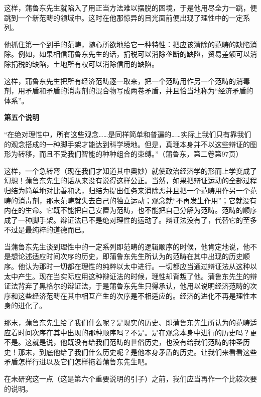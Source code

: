 \documentclass[a4paper,twoside,12pt,AutoFakeBold]{ctexart}
\begin{document}
这样，蒲鲁东先生就陷入了用正当方法难以摆脱的困境，于是他用尽全力一跳，便跳到一个新范畴的领域中。这时在他那惊异的目光面前便出现了理性中的一定系列。

他抓住第一个到手的范畴，随心所欲地给它一种特性：把应该清除的范畴的缺陷消除。例如，如果相信蒲鲁东先生的话，捐税可以消除垄断的缺陷，贸易差额可以消除捐税的缺陷，土地所有权可以消除信用的缺陷。

这样，蒲鲁东先生把所有经济范畴逐一取来，把一个范畴用作另一个范畴的消毒剂，用矛盾和矛盾的消毒剂的混合物写成两卷矛盾，并且恰当地称为“经济矛盾的体系”。

\begin{center}
    \textbf{第五个说明}
\end{center}

\begin{fangsong}
    “在绝对理性中，所有这些观念……是同样简单和普遍的……实际上我们只有靠我们的观念搭成的一种脚手架才能达到科学境地。但是，真理本身并不以这些辩证的图形为转移，而且不受我们智能的种种组合的束缚。”（蒲鲁东，第二卷第97页）
\end{fangsong}

这样，一个急转弯（现在我们才知道其中奥妙）就使政治经济学的形而上学变成了幻想！蒲鲁东先生的话从来没有说得这样公正。当然，如果把辩证运动的全部过程归结为简单地对比善和恶，归结为提出任务来消除恶并且把一个范畴用作另一个范畴的消毒剂，那末范畴就失去自己的独立运动；观念就“不再发生作用”；它就没有内在的生命。它既不能把自己安置为范畴，也不能把自己分解为范畴。范畴的顺序成了一种脚手架。辩证法已不是绝对理性的运动了。辩证法没有了，代替它的至多不过是最纯粹的道德而已。

当蒲鲁东先生谈到理性中的一定系列即范畴的逻辑顺序的时候，他肯定地说，他不是想论述适应时间次序的历史，即蒲鲁东先生所认为的范畴在其中出现的历史顺序。他认为那时一切都在理性的纯粹以太中进行。一切都应当通过辩证法从这种以太中产生。现在当实际应用这种辩证法的时候，理性却背叛了他。蒲鲁东先生的辩证法背弃了黑格尔的辩证法，于是蒲鲁东先生只得承认，他用以说明经济范畴的次序和这些经济范畴在其中相互产生的次序是不相适应的。经济的进化不再是理性本身的进化了。

那末，蒲鲁东先生给了我们什么呢？是现实的历史、即蒲鲁东先生所认为的范畴适应着时间次序在其中出现的那种顺序吗？不是。是在观念本身中进行的历史吗？更不是。这就是说，他既没有给我们范畴的世俗历史，也没有给我们范畴的神圣历史！那末，到底他给了我们什么历史呢？是他本身矛盾的历史。让我们来看看这些矛盾怎样行进以及它们怎样拖着蒲鲁东先生吧。

在未研究这一点（这是第六个重要说明的引子）之前，我们应当再作一个比较次要的说明。
\end{document}

